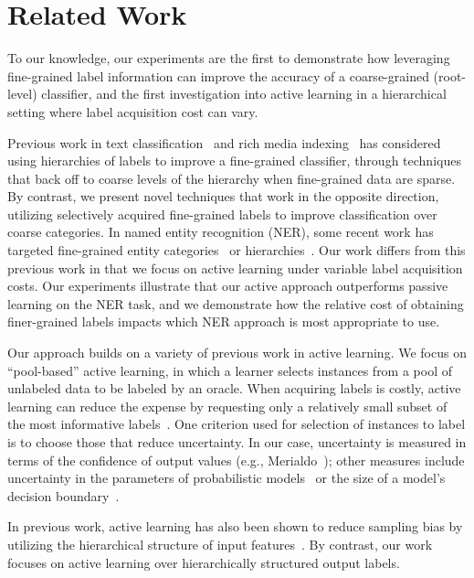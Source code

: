 \documentclass[10pt,conference,compsocconf]{IEEEtran}
\begin{document}
%


\section{Related Work}
\label{sec:relwork}

To our knowledge, our experiments are the first to demonstrate
how leveraging fine-grained label information can improve the
accuracy of a coarse-grained (root-level) classifier, and the first
investigation into active learning in a hierarchical setting where
label acquisition cost can vary.

Previous work in text classification~\cite{mccallum1998improving} and rich media indexing~\cite{jiang2013} has considered using
hierarchies of labels to improve a fine-grained classifier, through
techniques that back off to coarse
levels of the hierarchy when fine-grained data are sparse. 
By contrast, we present novel techniques
that work in the opposite direction, utilizing selectively
acquired fine-grained labels to improve
classification over coarse categories.
In named entity recognition (NER), some recent work has targeted
fine-grained entity categories~\cite{fleischman2002fine,ling2012fine}
or hierarchies~\cite{yosef2012hyena}.  Our work differs from this
previous work in that we focus on active learning under variable
label acquisition costs.
Our experiments illustrate that our active approach outperforms
passive learning on the NER task, and we demonstrate how the
relative cost of obtaining finer-grained labels impacts
which NER approach is most appropriate to use.

Our approach builds on a variety of previous work in active learning.
We focus on ``pool-based'' active learning, in which
a learner selects instances from a pool of unlabeled data to be 
labeled by an oracle. When acquiring
labels is costly, active learning can reduce
the expense by requesting only a relatively small subset
of the most informative labels~\cite{Rubens2011}.
One criterion used for selection of instances to label is to
choose those that reduce uncertainty. In our case,
uncertainty is measured in terms of the confidence of output values
(e.g., Merialdo~\cite{Merialdo2001}); other measures include
uncertainty in the parameters of probabilistic models~\cite{Hofmann2003}
or the size of a model's decision boundary~\cite{Schohn2000}.  

In previous work, active learning has also been shown 
to reduce sampling bias by utilizing the hierarchical structure of input
features~\cite{Dasgupta2008, Symons2006}. By contrast, 
our work focuses on active learning over hierarchically
structured output labels.
\end{document}
